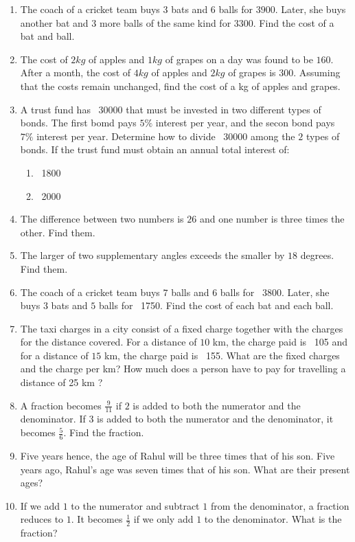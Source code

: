 \begin{enumerate}[label=\thesubsection.\arabic*,ref=\thesubsection.\theenumi]
\item The coach of a cricket team buys $3$ bats and $6$ balls for  \rupee $ 3900$. Later, she buys another bat and $3$ more balls of the same kind for  \rupee $ 3300$. Find the cost of a bat and ball.
\item The cost of $2kg$ of apples and $1kg$ of grapes on a day was found to be  \rupee $ 160$. After a month, the cost of $4kg$ of apples and $2kg$ of grapes is  \rupee $ 300$. Assuming that the costs remain unchanged, find the cost of a kg of apples and grapes. 
\item A trust fund has \rupee~30000 that must be invested in two different types of bonds. The first bomd pays $5\%$  interest per year, and the secon bond pays $7\%$ interest per year.  Determine how to divide \rupee~30000 among the $2$ types of bonds. If the trust fund must obtain an annual total interest of:
\begin{enumerate}
\item \rupee~1800
\item \rupee~2000
\end{enumerate}
    \item The difference between two numbers is $26$ and one number is three times the other. Find them.
    \item The larger of two supplementary angles exceeds the smaller by $18$ degrees. Find them.
    \item The coach of a cricket team buys $7$ balls and $6$ balls for \rupee~3800. Later, she buys $3$ bats and $5$ balls for \rupee~1750. Find the cost of each bat and each ball.
    \item The taxi charges in a city consist of a fixed charge together with the charges for the distance covered. For a distance of $10$ km, the charge paid is \rupee~105 and for a distance of $15$ km, the charge paid is \rupee~155. What are the fixed charges and the charge per km? How much does a person have to pay for travelling a distance of 25 km ? 
    \item A fraction becomes $\frac{9}{11}$ if $2$ is added to both the numerator and the denominator. If $3$ is added to both the numerator and the denominator, it becomes $\frac{5}{6}$. Find the fraction.
    \item Five years hence, the age of Rahul will be three times that of his son. Five years ago, Rahul's age was seven times that of his son. What are their present ages?
\item If we add $1$ to the numerator and subtract $1$ from the denominator, a fraction reduces to $1$. It becomes $\frac{1}{2}$ if we only add $1$ to the denominator. What is the fraction?

\end{enumerate}
